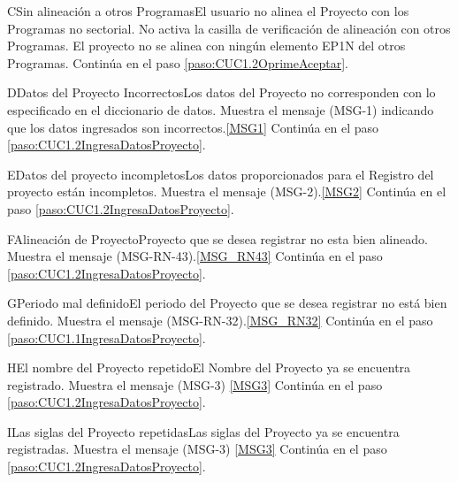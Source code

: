 	\begin{UCtrayectoriaA}{C}{Sin alineación a otros Programas}{El usuario no alinea el Proyecto con los Programas no sectorial.}
			\UCpaso[\UCactor] No activa la casilla de verificación de alineación con otros Programas.
			\UCpaso El proyecto no se alinea con ningún elemento EP1N del otros Programas.
			\UCpaso Continúa en el paso \ref{paso:CUC1.2OprimeAceptar}.
	\end{UCtrayectoriaA}

	\begin{UCtrayectoriaA}{D}{Datos del Proyecto Incorrectos}{Los datos del Proyecto no corresponden con lo especificado en el diccionario de datos.}
			\UCpaso Muestra el mensaje (MSG-1) indicando que los datos ingresados son incorrectos.\ref{MSG1}
			\UCpaso Continúa en el paso \ref{paso:CUC1.2IngresaDatosProyecto}.
	\end{UCtrayectoriaA}

	\begin{UCtrayectoriaA}{E}{Datos del proyecto incompletos}{Los datos proporcionados para el Registro del proyecto están incompletos.}
			\UCpaso Muestra el mensaje (MSG-2).\ref{MSG2}
			\UCpaso Continúa en el paso \ref{paso:CUC1.2IngresaDatosProyecto}.
	\end{UCtrayectoriaA}

	\begin{UCtrayectoriaA}{F}{Alineación de Proyecto}{Proyecto que se desea registrar no esta bien alineado.}
			\UCpaso Muestra el mensaje (MSG-RN-43).\ref{MSG_RN43}
			\UCpaso Continúa en el paso \ref{paso:CUC1.2IngresaDatosProyecto}.
	\end{UCtrayectoriaA}

	\begin{UCtrayectoriaA}{G}{Periodo mal definido}{El periodo del Proyecto que se desea registrar no está bien definido.}
			\UCpaso Muestra el mensaje (MSG-RN-32).\ref{MSG_RN32}
			\UCpaso Continúa en el paso \ref{paso:CUC1.1IngresaDatosProyecto}.
	\end{UCtrayectoriaA}

	\begin{UCtrayectoriaA}{H}{El nombre del Proyecto repetido}{El Nombre del Proyecto ya se encuentra registrado.}
			\UCpaso Muestra el mensaje (MSG-3) \ref{MSG3}
			\UCpaso Continúa en el paso \ref{paso:CUC1.2IngresaDatosProyecto}.
	\end{UCtrayectoriaA}

	\begin{UCtrayectoriaA}{I}{Las siglas del Proyecto repetidas}{Las siglas del Proyecto ya se encuentra registradas.}
			\UCpaso Muestra el mensaje (MSG-3) \ref{MSG3}
			\UCpaso Continúa en el paso \ref{paso:CUC1.2IngresaDatosProyecto}.
	\end{UCtrayectoriaA}
